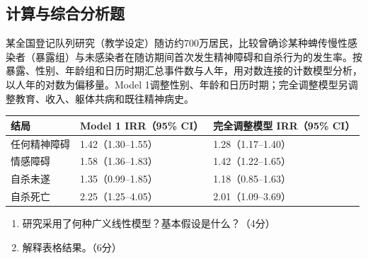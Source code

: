 \par\addvspace{8pt}\noindent\begin{minipage}{\linewidth}

\subsection{计算与综合分析题}


某全国登记队列研究（教学设定）随访约700万居民，比较曾确诊某种蜱传慢性感染者（暴露组）与未感染者在随访期间首次发生精神障碍和自杀行为的发生率。按暴露、性别、年龄组和日历时期汇总事件数与人年，用对数连接的计数模型分析，以人年的对数为偏移量。Model 1调整性别、年龄和日历时期；完全调整模型另调整教育、收入、躯体共病和既往精神病史。

\begin{center}\small\setlength{\tabcolsep}{4pt}\renewcommand{\arraystretch}{1.22}\begin{tabular}{@{}lll@{}}
\toprule
结局 & Model 1 IRR（95\% CI） & 完全调整模型 IRR（95\% CI） \\
\midrule
任何精神障碍 & 1.42（1.30--1.55） & 1.28（1.17--1.40） \\
情感障碍 & 1.58（1.36--1.83） & 1.42（1.22--1.65） \\
自杀未遂 & 1.35（0.99--1.85） & 1.18（0.85--1.63） \\
自杀死亡 & 2.25（1.25--4.05） & 2.01（1.09--3.69） \\
\bottomrule\end{tabular}\end{center}

\begin{enumerate}
\def\labelenumi{\arabic{enumi}.}
\tightlist
\item
  研究采用了何种广义线性模型？基本假设是什么？（4分）
\item
  解释表格结果。（6分）
\end{enumerate}


\end{minipage}\par\vspace{5pt}

